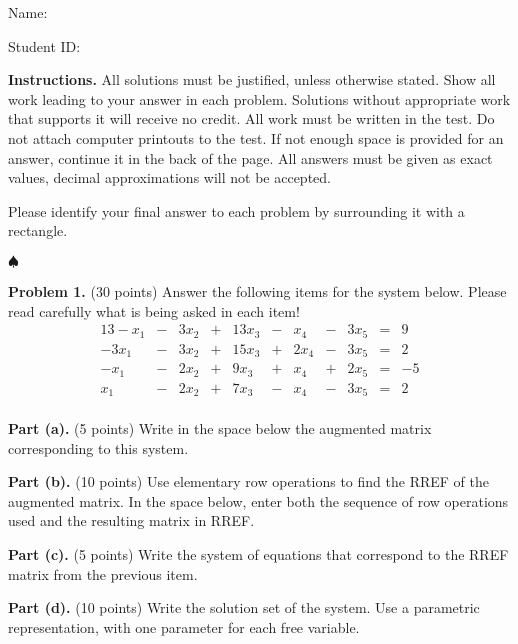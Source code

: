 \documentclass[12pt]{article}
\begin{document}
Name: \hrulefill

\bigskip
Student ID: \hrulefill

\bigskip
\textbf{Instructions.} All solutions must be justified, unless otherwise stated. Show all work leading to your answer in each problem. Solutions without appropriate work that supports it will receive no credit. All work must be written in the test. Do not attach computer printouts to the test. If not enough space is provided for an answer, continue it in the back of the page. All answers must be given as exact values, decimal approximations will not be accepted.

Please identify your final answer to each problem by surrounding it with a rectangle.

\vfill
\hfill$\spadesuit$

\clearpage

\textbf{Problem 1.} (30 points)
Answer the following items for the system below. Please read carefully what is being asked in each item!
\begin{alignat*}{13}
- x_{1} &{}-{}& 3 x_{2} &{}+{}& 13 x_{3} &{}-{}& x_{4} &{}-{}& 3 x_{5} &{}={}&9\\ 
- 3 x_{1} &{}-{}& 3 x_{2} &{}+{}& 15 x_{3} &{}+{}& 2 x_{4} &{}-{}& 3 x_{5} &{}={}&2\\ 
- x_{1} &{}-{}& 2 x_{2} &{}+{}& 9 x_{3} &{}+{}& x_{4} &{}+{}& 2 x_{5} &{}={}&-5\\ 
x_{1} &{}-{}& 2 x_{2} &{}+{}& 7 x_{3} &{}-{}& x_{4} &{}-{}& 3 x_{5} &{}={}&2\\ 
\end{alignat*}

\textbf{Part (a).} (5 points) Write in the space below the augmented matrix corresponding to this system.

\vskip1.5in

\textbf{Part (b).} (10 points) Use elementary row operations to find the RREF of the augmented matrix. In the space below, enter both the sequence of row operations used and the resulting matrix in RREF.

\clearpage

\textbf{Part (c).} (5 points) Write the system of equations that correspond to the RREF matrix from the previous item.

\vskip3in

\textbf{Part (d).} (10 points) Write the solution set of the system. Use a parametric representation, with one parameter for each free variable.

\clearpage
\end{document}
